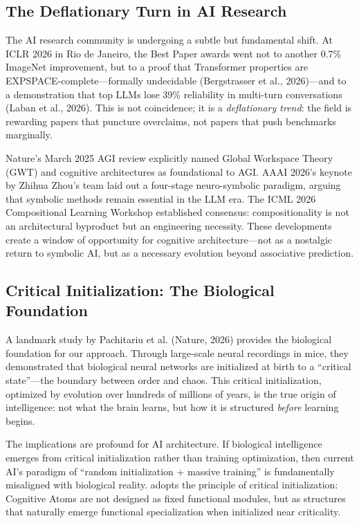 \documentclass[11pt,a4paper]{article}
\theoremstyle{definition}
\theoremstyle{remark}
\newcommand{\CAA}{\text{CAA-X}}
\begin{document}
\subsection{The Deflationary Turn in AI Research}\label{subsec:deflationary}

The AI research community is undergoing a subtle but fundamental shift. At ICLR 2026 in Rio de Janeiro, the Best Paper awards went not to another 0.7\% ImageNet improvement, but to a proof that Transformer properties are EXPSPACE-complete---formally undecidable (Bergstrasser et al., 2026)---and to a demonstration that top LLMs lose 39\% reliability in multi-turn conversations (Laban et al., 2026). This is not coincidence; it is a \textit{deflationary trend}: the field is rewarding papers that puncture overclaims, not papers that push benchmarks marginally.

Nature's March 2025 AGI review explicitly named Global Workspace Theory (GWT) and cognitive architectures as foundational to AGI. AAAI 2026's keynote by Zhihua Zhou's team laid out a four-stage neuro-symbolic paradigm, arguing that symbolic methods remain essential in the LLM era. The ICML 2026 Compositional Learning Workshop established consensus: compositionality is not an architectural byproduct but an engineering necessity. These developments create a window of opportunity for cognitive architecture---not as a nostalgic return to symbolic AI, but as a necessary evolution beyond associative prediction.

\subsection{Critical Initialization: The Biological Foundation}\label{subsec:critical-init}

A landmark study by Pachitariu et al. (Nature, 2026) provides the biological foundation for our approach. Through large-scale neural recordings in mice, they demonstrated that biological neural networks are initialized at birth to a ``critical state''---the boundary between order and chaos. This critical initialization, optimized by evolution over hundreds of millions of years, is the true origin of intelligence: not what the brain learns, but how it is structured \textit{before} learning begins.

The implications are profound for AI architecture. If biological intelligence emerges from critical initialization rather than training optimization, then current AI's paradigm of ``random initialization + massive training'' is fundamentally misaligned with biological reality. \CAA{} adopts the principle of critical initialization: Cognitive Atoms are not designed as fixed functional modules, but as structures that naturally emerge functional specialization when initialized near criticality.
\end{document}
